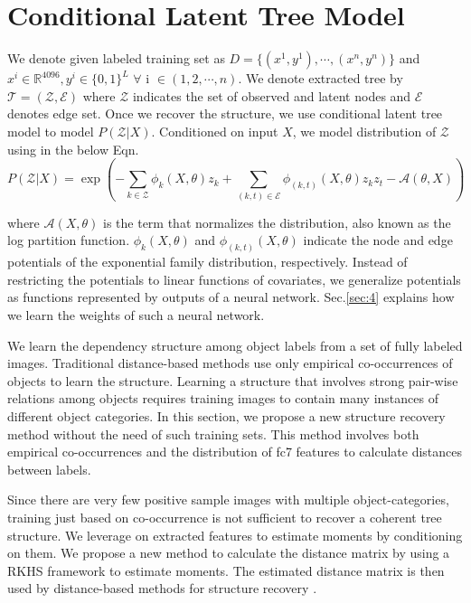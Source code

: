 \documentclass{article}
\begin{document}
\section{Conditional Latent Tree Model} \label{sec:3}

We denote given labeled training set as $D =\{(x^{1},y^{1}),\cdots,(x^{n},y^{n})\}$  and  $ x^{i} \in  \mathbb{R}^{4096} , y^{i} \in  \{0,1\}^L$ $\forall$  i  $\in  (1,2,\cdots,n)$. We denote extracted tree by $ \mathcal{T} = (\mathcal{Z}, \mathcal{E})$ where $\mathcal{Z}$ indicates the set of observed and latent nodes and $\mathcal{E}$ denotes edge set.  Once we recover the structure, we use conditional latent tree model to model $P( \mathcal{Z}|X)$. Conditioned on input $X$, we model distribution of $\mathcal{Z}$  using in the below Eqn.
\begin{equation*}
P(\mathcal{Z} | X)  = \exp\left(-\sum_{k \in \mathcal{Z}}\phi_{k}(X, \theta)z_{k}+    \sum_{(k,t) \in \mathcal{E}}\phi_{(k,t)}(X,\theta)z_{k}z_{t}  - \mathcal{A}(\theta,X)\right)
\end{equation*}

where $\mathcal{A}(X, \theta)$ is the term that normalizes the distribution, also known as the log partition function. $\phi_{k}(X, \theta)$ and  $\phi_{(k,t)}(X, \theta)$
indicate the node and edge potentials of the exponential family distribution, respectively. Instead of restricting the potentials to linear functions of covariates, we generalize potentials as functions represented by outputs of a neural network. Sec.\ref{sec:4} explains how we learn the weights of such a neural network.



We learn the dependency structure among object labels from a set of fully labeled images. Traditional distance-based methods use only empirical co-occurrences of objects to learn the structure. Learning a structure that involves strong pair-wise relations among objects requires  training images to contain many instances of different object categories.
In this section, we propose a new structure recovery method without the need of such training sets. This method involves both empirical co-occurrences and the distribution of fc7 features to calculate distances between labels.

Since there are very few positive sample images with multiple object-categories, training just based on co-occurrence is not sufficient to recover a coherent tree structure. We  leverage on extracted features to estimate moments by conditioning on them. We propose a new method to calculate the distance matrix by using a RKHS framework to estimate moments. The estimated distance matrix is then used by distance-based methods for structure recovery \cite{LTM}.
\end{document}
